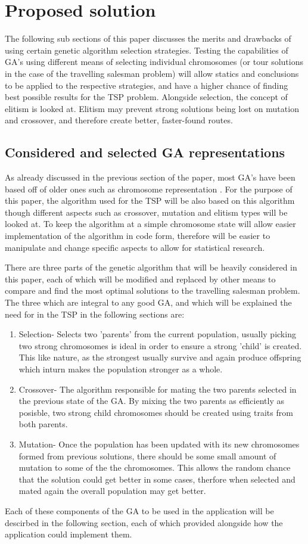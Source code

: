 \documentclass[article]{IEEEtran}
\begin{document}
\section{Proposed solution}
The following sub sections of this paper discusses the merits and drawbacks of using certain genetic algorithm selection strategies. Testing the capabilities of GA's using different means of selecting individual chromosomes (or tour solutions in the case of the travelling salesman problem) will allow statics and conclusions to be applied to the respective strategies, and have a higher chance of finding best possible results for the TSP problem. Alongside selection, the concept of elitism is looked at. Elitism may prevent strong solutions being lost on mutation and crossover, and therefore create better, faster-found routes. 

\subsection{Considered and selected GA representations}
As already discussed in the previous section of the paper, most GA's have been based off of older ones such as chromosome representation \cite{5}. For the purpose of this paper, the algorithm used for the TSP will be also based on this algorithm though different aspects such as crossover, mutation and elitism types will be looked at. To keep the algorithm at a simple chromosome state will allow easier implementation of the algorithm in code form, therefore will be easier to manipulate and change specific aspects to allow for statistical research. \par
There are three parts of the genetic algorithm that will be heavily considered in this paper, each of which will be modified and replaced by other means to compare and find the most optimal solutions to the travelling salesman problem. The three which are integral to any good GA, and which will be explained the need for in the TSP in the following sections are:
\begin{enumerate}
\item Selection- Selects two 'parents' from the current population, usually picking two strong chromosomes is ideal in order to ensure a strong 'child' is created. This like nature, as the strongest usually survive and again produce offspring which inturn makes the population stronger as a whole.
\item Crossover- The algorithm responsible for mating the two parents selected in the previous state of the GA. By mixing the two parents as efficiently as posisble, two strong child chromosomes should be created using traits from both parents. 
\item Mutation- Once the population has been updated with its new chromosomes formed from previous solutions, there should be some small amount of mutation to some of the the chromosomes. This allows the random chance that the solution could get better in some cases, therfore when selected and mated again the overall population may get better.
\end{enumerate}
Each of these components of the GA to be used in the application will be descirbed in the following section, each of which provided alongside how the application could implement them.
\end{document}
